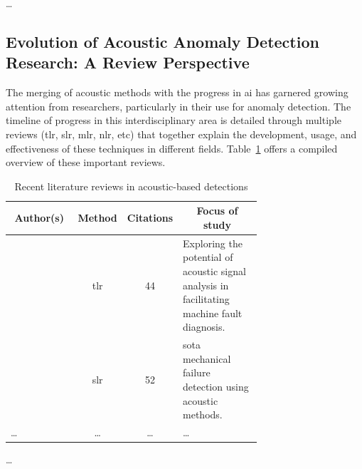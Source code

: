 \dots

\subsection{Evolution of Acoustic Anomaly Detection Research: A Review Perspective} \label{sec:evo_and}
The merging of acoustic methods with the progress in \gls{ai} has garnered growing attention from researchers, particularly in their use for anomaly detection. The timeline of progress in this interdisciplinary area is detailed through multiple reviews (\gls{tlr}, \gls{slr}, \gls{mlr}, \gls{nlr}, \gls{etc}) that together explain the development, usage, and effectiveness of these techniques in different fields. Table~\ref{tab:recent_literature_reviews} offers a compiled overview of these important reviews.

\begin{table}[!ht]
	\centering
	\caption{Recent literature reviews in acoustic-based detections}
	\label{tab:recent_literature_reviews}
    \small
	\begin{tabular}{p{0.3\linewidth}ccp{0.4\linewidth}}
		\toprule
		\multicolumn{1}{c}{Author(s)}&\multicolumn{1}{c}{Method}&Citations&\multicolumn{1}{c}{Focus of study}\\
		\midrule
		\citet{Shaikh2021} & \gls{tlr} & 44 & Exploring the potential of acoustic signal analysis in facilitating machine fault diagnosis.\\
		\hline
		\citet{Qurthobi2022}& \gls{slr} & 52 & \Gls{sota} mechanical failure detection using acoustic methods.\\
		\hline
		\dots& \dots & \dots & \dots\\
		\bottomrule
	\end{tabular}
\end{table}
\dots
